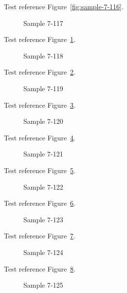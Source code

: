 Test reference Figure~\ref{fig:sample-7-116}.

\begin{figure}[tbhp]
\caption{Sample 7-117}
\label{fig:sample-7-117}
\end{figure}

Test reference Figure~\ref{fig:sample-7-117}.

\begin{figure}[tbhp]
\caption{Sample 7-118}
\label{fig:sample-7-118}
\end{figure}

Test reference Figure~\ref{fig:sample-7-118}.

\begin{figure}[tbhp]
\caption{Sample 7-119}
\label{fig:sample-7-119}
\end{figure}

Test reference Figure~\ref{fig:sample-7-119}.

\begin{figure}[tbhp]
\caption{Sample 7-120}
\label{fig:sample-7-120}
\end{figure}

Test reference Figure~\ref{fig:sample-7-120}.

\begin{figure}[tbhp]
\caption{Sample 7-121}
\label{fig:sample-7-121}
\end{figure}

Test reference Figure~\ref{fig:sample-7-121}.

\begin{figure}[tbhp]
\caption{Sample 7-122}
\label{fig:sample-7-122}
\end{figure}

Test reference Figure~\ref{fig:sample-7-122}.

\begin{figure}[tbhp]
\caption{Sample 7-123}
\label{fig:sample-7-123}
\end{figure}

Test reference Figure~\ref{fig:sample-7-123}.

\begin{figure}[tbhp]
\caption{Sample 7-124}
\label{fig:sample-7-124}
\end{figure}

Test reference Figure~\ref{fig:sample-7-124}.

\begin{figure}[tbhp]
\caption{Sample 7-125}
\label{fig:sample-7-125}
\end{figure}

